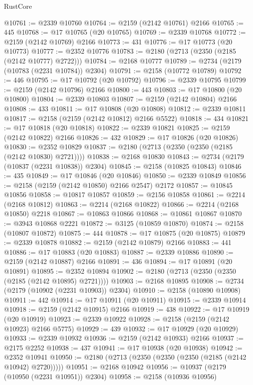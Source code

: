 \begin{lexlean}{RustCore}
\begin{coremodule}
@10761 := @2339 @10760
@10764 := @2159 (@2142 @10761) @2166
@10765 := 445
@10768 := @17 @10765 (@20 @10765)
@10769 := @2339 @10768
@10772 := @2159 (@2142 @10769) @2166
@10773 := 431
@10776 := @17 @10773 (@20 @10773)
@10777 := @2352 @10776
@10783 := @2180 (@2713 (@2350 (@2185 (@2142 @10777) @2722)))
@10784 := @2168 @10777
@10789 := @2734 (@2179 (@10783 (@2231 @10784)) @2304)
@10791 := @2158 (@10772 @10789)
@10792 := 446
@10795 := @17 @10792 (@20 @10792)
@10796 := @2339 @10795
@10799 := @2159 (@2142 @10796) @2166
@10800 := 443
@10803 := @17 @10800 (@20 @10800)
@10804 := @2339 @10803
@10807 := @2159 (@2142 @10804) @2166
@10808 := 433
@10811 := @17 @10808 (@20 @10808)
@10812 := @2339 @10811
@10817 := @2158 (@2159 (@2142 @10812) @2166 @5522)
@10818 := 434
@10821 := @17 @10818 (@20 @10818)
@10822 := @2339 @10821
@10825 := @2159 (@2142 @10822) @2166
@10826 := 432
@10829 := @17 @10826 (@20 @10826)
@10830 := @2352 @10829
@10837 := @2180 (@2713 (@2350 (@2350 (@2185 (@2142 @10830) @2721))))
@10838 := @2168 @10830
@10843 := @2734 (@2179 (@10837 (@2231 @10838)) @2304)
@10845 := @2158 (@10825 @10843)
@10846 := 435
@10849 := @17 @10846 (@20 @10846)
@10850 := @2339 @10849
@10856 := @2158 (@2159 (@2142 @10850) @2166 @2547) @2172
@10857 := @10845 @10856
@10858 := @10817 @10857
@10859 := @2156 @10858
@10861 := @2214 (@2168 @10812)
@10863 := @2214 (@2168 @10822)
@10866 := @2214 (@2168 @10850) @2218
@10867 := @10863 @10866
@10868 := @10861 @10867
@10870 := @3943 @10868 @2221
@10872 := @3125 (@10859 @10870)
@10874 := @2158 (@10807 @10872)
@10875 := 444
@10878 := @17 @10875 (@20 @10875)
@10879 := @2339 @10878
@10882 := @2159 (@2142 @10879) @2166
@10883 := 441
@10886 := @17 @10883 (@20 @10883)
@10887 := @2339 @10886
@10890 := @2159 (@2142 @10887) @2166
@10891 := 436
@10894 := @17 @10891 (@20 @10891)
@10895 := @2352 @10894
@10902 := @2180 (@2713 (@2350 (@2350 (@2185 (@2142 @10895) @2721))))
@10903 := @2168 @10895
@10908 := @2734 (@2179 (@10902 (@2231 @10903)) @2304)
@10910 := @2158 (@10890 @10908)
@10911 := 442
@10914 := @17 @10911 (@20 @10911)
@10915 := @2339 @10914
@10918 := @2159 (@2142 @10915) @2166
@10919 := 438
@10922 := @17 @10919 (@20 @10919)
@10923 := @2339 @10922
@10928 := @2158 (@2159 (@2142 @10923) @2166 @5775)
@10929 := 439
@10932 := @17 @10929 (@20 @10929)
@10933 := @2339 @10932
@10936 := @2159 (@2142 @10933) @2166
@10937 := @2175 @2252
@10938 := 437
@10941 := @17 @10938 (@20 @10938)
@10942 := @2352 @10941
@10950 := @2180 (@2713 (@2350 (@2350 (@2350 (@2185 (@2142 @10942) @2720)))))
@10951 := @2168 @10942
@10956 := @10937 (@2179 (@10950 (@2231 @10951)) @2304)
@10958 := @2158 (@10936 @10956)

\end{coremodule}
\end{lexlean}
